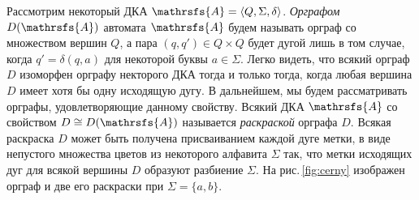 \documentclass[11pt]{article}
\begin{document}
Рассмотрим некоторый ДКА $\mathrsfs{A}=\langle Q,\Sigma,\delta\rangle$.
\emph{Орграфом} $D(\mathrsfs{A})$ автомата $\mathrsfs{A}$ будем 
называть орграф со множеством вершин $Q$, а пара $(q,q')\in Q\times Q$ будет 
дугой лишь в том случае, когда $q'=\delta(q,a)$ для некоторой буквы $a\in\Sigma$.
Легко видеть, что всякий орграф $D$ изоморфен орграфу некторого ДКА тогда и только тогда,
когда любая вершина $D$ имеет хотя бы одну исходящую дугу. В дальнейшем, мы будем 
рассматривать орграфы, удовлетворяющие данному свойству.  
Всякий ДКА $\mathrsfs{A}$ со свойством $D\cong D(\mathrsfs{A})$ называется
\emph{раскраской} орграфа $D$. Всякая раскраска $D$ может быть получена
присваиванием каждой дуге метки, в виде непустого множества цветов из некоторого алфавита $\Sigma$ так, 
что метки исходящих дуг для всякой вершины $D$ образуют разбиение $\Sigma$. На рис.\,\ref{fig:cerny} 
изображен орграф и две его раскраски при $\Sigma=\{a,b\}$.


\end{document}
